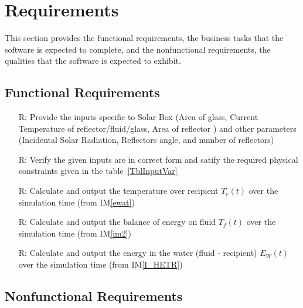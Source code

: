 \documentclass[12pt]{article}
\newcommand{\iref}[1]{IM\ref{#1}}
\newcounter{reqnum} %
\begin{document}
\section{Requirements}


This section provides the functional requirements, the business tasks that the
software is expected to complete, and the nonfunctional requirements, the
qualities that the software is expected to exhibit.

\subsection{Functional Requirements}

\noindent \begin{itemize}

\item[R\refstepcounter{reqnum}\thereqnum \label{R_Inputs}:] Provide the inputs specific to Solar Box (Area of glass, Current Temperature of reflector/fluid/glass, Area of reflector ) and other parameters (Incidental Solar Radiation, Reflectors angle, and number of reflectors)

\item[R\refstepcounter{reqnum}\thereqnum \label{R_VerifyOutput}:]
  Verify the given inputs are in correct form and satify the required physical constraints given in the table~\ref{TblInputVar}

\item[R\refstepcounter{reqnum}\thereqnum \label{R_Calculate}:] Calculate and output the temperature over recipient $T_r(t)$ over the simulation time (from \iref{ewat})

\item[R\refstepcounter{reqnum}\thereqnum \label{R_Calculate_im2}:] Calculate and output the balance of energy on fluid $T_f(t)$ over the simulation time (from \iref{im2})

\item[R\refstepcounter{reqnum}\thereqnum \label{R_Output}:] Calculate and output the energy in the water (fluid - recipient) $E_W(t)$ over the simulation time (from \iref{I_HETR})

\end{itemize}


\subsection{Nonfunctional Requirements}


\noindent 
\end{document}
